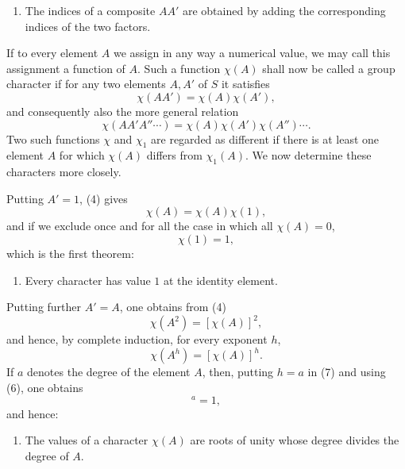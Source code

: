 \documentclass[11pt]{article}
\begin{document}
\begin{enumerate}[label=\arabic*.]
\item The indices of a composite $AA'$ are obtained by adding the corresponding indices of the two factors.
\end{enumerate}

If to every element $A$ we assign in any way a numerical value, we may call this assignment a function of $A$. Such a function $\chi(A)$ shall now be called a group character if for any two elements $A,A'$ of $S$ it satisfies
\begin{equation}
\chi(AA')=\chi(A)\chi(A'),
\tag{4}
\end{equation}
and consequently also the more general relation
\[
\chi(AA'A''\cdots)=\chi(A)\chi(A')\chi(A'')\cdots.
\]
Two such functions $\chi$ and $\chi_1$ are regarded as different if there is at least one element $A$ for which $\chi(A)$ differs from $\chi_1(A)$. We now determine these characters more closely.

Putting $A'=1$, (4) gives
\begin{equation}
\chi(A)=\chi(A)\chi(1),
\tag{5}
\end{equation}
and if we exclude once and for all the case in which all $\chi(A)=0$,
\begin{equation}
\chi(1)=1,
\tag{6}
\end{equation}
which is the first theorem:

\begin{enumerate}[resume,label=\arabic*.]
\item Every character has value $1$ at the identity element.
\end{enumerate}

Putting further $A'=A$, one obtains from (4)
\[
\chi(A^2)=[\chi(A)]^2,
\]
and hence, by complete induction, for every exponent $h$,
\begin{equation}
\chi(A^h)=[\chi(A)]^h.
\tag{7}
\end{equation}
If $a$ denotes the degree of the element $A$, then, putting $h=a$ in (7) and using (6), one obtains
\begin{equation}
[\chi(A)]^a=1,
\tag{8}
\end{equation}
and hence:

\begin{enumerate}[resume,label=\arabic*.]
\item The values of a character $\chi(A)$ are roots of unity whose degree divides the degree of $A$.
\end{enumerate}
\end{document}
